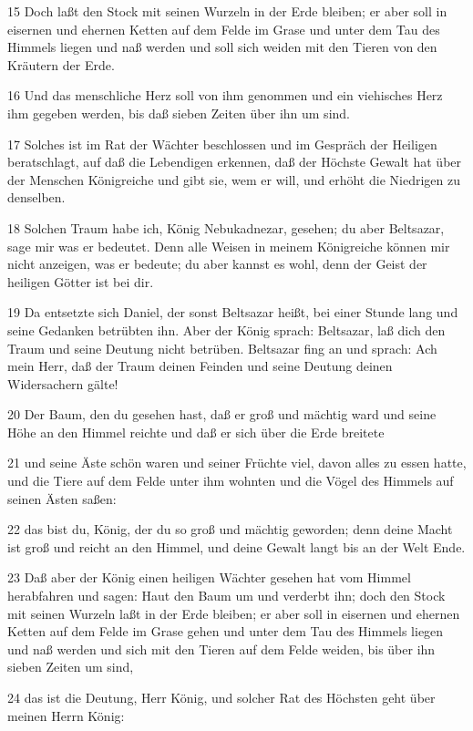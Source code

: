 \par 15 Doch laßt den Stock mit seinen Wurzeln in der Erde bleiben; er aber soll in eisernen und ehernen Ketten auf dem Felde im Grase und unter dem Tau des Himmels liegen und naß werden und soll sich weiden mit den Tieren von den Kräutern der Erde.
\par 16 Und das menschliche Herz soll von ihm genommen und ein viehisches Herz ihm gegeben werden, bis daß sieben Zeiten über ihn um sind.
\par 17 Solches ist im Rat der Wächter beschlossen und im Gespräch der Heiligen beratschlagt, auf daß die Lebendigen erkennen, daß der Höchste Gewalt hat über der Menschen Königreiche und gibt sie, wem er will, und erhöht die Niedrigen zu denselben.
\par 18 Solchen Traum habe ich, König Nebukadnezar, gesehen; du aber Beltsazar, sage mir was er bedeutet. Denn alle Weisen in meinem Königreiche können mir nicht anzeigen, was er bedeute; du aber kannst es wohl, denn der Geist der heiligen Götter ist bei dir.
\par 19 Da entsetzte sich Daniel, der sonst Beltsazar heißt, bei einer Stunde lang und seine Gedanken betrübten ihn. Aber der König sprach: Beltsazar, laß dich den Traum und seine Deutung nicht betrüben. Beltsazar fing an und sprach: Ach mein Herr, daß der Traum deinen Feinden und seine Deutung deinen Widersachern gälte!
\par 20 Der Baum, den du gesehen hast, daß er groß und mächtig ward und seine Höhe an den Himmel reichte und daß er sich über die Erde breitete
\par 21 und seine Äste schön waren und seiner Früchte viel, davon alles zu essen hatte, und die Tiere auf dem Felde unter ihm wohnten und die Vögel des Himmels auf seinen Ästen saßen:
\par 22 das bist du, König, der du so groß und mächtig geworden; denn deine Macht ist groß und reicht an den Himmel, und deine Gewalt langt bis an der Welt Ende.
\par 23 Daß aber der König einen heiligen Wächter gesehen hat vom Himmel herabfahren und sagen: Haut den Baum um und verderbt ihn; doch den Stock mit seinen Wurzeln laßt in der Erde bleiben; er aber soll in eisernen und ehernen Ketten auf dem Felde im Grase gehen und unter dem Tau des Himmels liegen und naß werden und sich mit den Tieren auf dem Felde weiden, bis über ihn sieben Zeiten um sind,
\par 24 das ist die Deutung, Herr König, und solcher Rat des Höchsten geht über meinen Herrn König:
